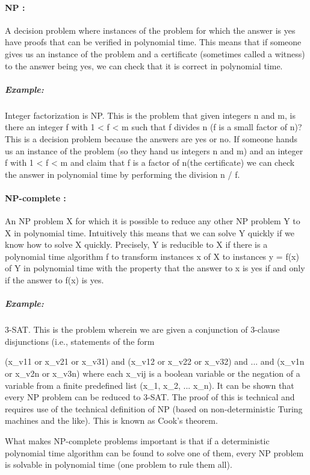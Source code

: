 \documentclass[12pt]{article}
\begin{document}
\paragraph{NP :} A decision problem where instances of the problem for which the answer is yes have proofs that can be verified in polynomial time. This means that if someone gives us an instance of the problem and a certificate (sometimes called a witness) to the answer being yes, we can check that it is correct in polynomial time.

\subparagraph{\textit{Example:}} Integer factorization is NP. This is the problem that given integers n and m, is there an integer f with 1 < f < m such that f divides n (f is a small factor of n)? This is a decision problem because the answers are yes or no. If someone hands us an instance of the problem (so they hand us integers n and m) and an integer f with 1 < f < m and claim that f is a factor of n(the certificate) we can check the answer in polynomial time by performing the division n / f.

\paragraph{NP-complete :} An NP problem X for which it is possible to reduce any other NP problem Y to X in polynomial time. Intuitively this means that we can solve Y quickly if we know how to solve X quickly. Precisely, Y is reducible to X if there is a polynomial time algorithm f to transform instances x of X to instances y = f(x) of Y in polynomial time with the property that the answer to x is yes if and only if the answer to f(x) is yes.

\subparagraph{\textit{Example:}} 3-SAT. This is the problem wherein we are given a conjunction of 3-clause disjunctions (i.e., statements of the form

(x\_v11 or x\_v21 or x\_v31) and 
(x\_v12 or x\_v22 or x\_v32) and 
...                       and 
(x\_v1n or x\_v2n or x\_v3n)
where each x\_vij is a boolean variable or the negation of a variable from a finite predefined list (x\_1, x\_2, ... x\_n). It can be shown that every NP problem can be reduced to 3-SAT. The proof of this is technical and requires use of the technical definition of NP (based on non-deterministic Turing machines and the like). This is known as Cook's theorem.

What makes NP-complete problems important is that if a deterministic polynomial time algorithm can be found to solve one of them, every NP problem is solvable in polynomial time (one problem to rule them all).
\end{document}
